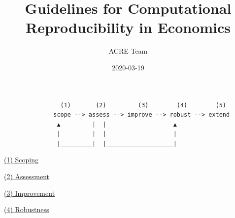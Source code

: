 \documentclass[]{book}
\title{Guidelines for Computational Reproducibility in Economics}
\author{ACRE Team}
\date{2020-03-19}
\begin{document}
\maketitle

{
\setcounter{tocdepth}{1}
\tableofcontents
}
\hypertarget{section}{%
\chapter*{}\label{section}}

\begin{verbatim}
                (1)       (2)         (3)        (4)        (5)
              scope --> assess --> improve --> robust --> extend
               ▲         |  |                   ▲
               |         |  |                   |
               |_________|  |___________________|
\end{verbatim}

\protect\hyperlink{scoping}{(1) Scoping}

\protect\hyperlink{assessment}{(2) Assessment}

\protect\hyperlink{improvements}{(3) Improvement}

\protect\hyperlink{robust}{(4) Robustness}
\end{document}
